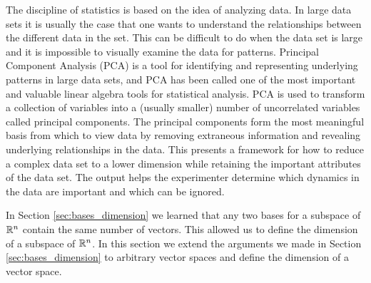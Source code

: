  \label{chap:dimension}

\vspace*{-17 pt}
 
\vspace*{13 pt}

\label{sec:appl_pca}

The discipline of statistics is based on the idea of analyzing data. In large data sets it is usually the case that one wants to understand the relationships between the different data in the set. This can be difficult to do when the data set is large and it is impossible to visually examine the data for patterns. Principal Component Analysis (PCA) is a tool for identifying and representing underlying patterns in large data sets, and PCA has been called one of the most important and valuable linear algebra tools for statistical analysis. PCA is used to transform a collection of variables into a (usually smaller) number of uncorrelated variables called principal components. The principal components form the most meaningful basis from which to view data by removing extraneous information and revealing underlying relationships in the data. This presents a framework for how to reduce a complex data set to a lower dimension while retaining the important attributes of the data set.  The output helps the experimenter determine which dynamics in the data are important and which can be ignored. 

\label{sec:dims_intro}

In Section \ref{sec:bases_dimension} we learned that any two bases for a subspace of $\mathbb{R}^n$ contain the same number of vectors. This allowed us to define the dimension of a subspace of $\mathbb{R}^n$. In this section we extend the arguments we made in Section \ref{sec:bases_dimension} to arbitrary vector spaces and define the dimension of a vector space. 

